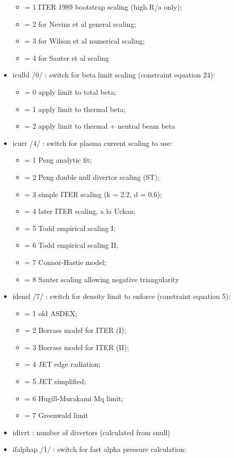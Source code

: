 \documentclass[]{article}
\providecommand{\tightlist}{%
  \setlength{\itemsep}{0pt}\setlength{\parskip}{0pt}}
\begin{document}
\begin{itemize}
  \begin{itemize}
  \tightlist
  \item
    = 1 ITER 1989 bootstrap scaling (high R/a only);
  \item
    = 2 for Nevins et al general scaling;
  \item
    = 3 for Wilson et al numerical scaling;
  \item
    = 4 for Sauter et al scaling
  \end{itemize}
\item
  iculbl /0/ : switch for beta limit scaling (constraint equation 24):

  \begin{itemize}
  \tightlist
  \item
    = 0 apply limit to total beta;
  \item
    = 1 apply limit to thermal beta;
  \item
    = 2 apply limit to thermal + neutral beam beta
  \end{itemize}
\item
  icurr /4/ : switch for plasma current scaling to use:

  \begin{itemize}
  \tightlist
  \item
    = 1 Peng analytic fit;
  \item
    = 2 Peng double null divertor scaling (ST);
  \item
    = 3 simple ITER scaling (k = 2.2, d = 0.6);
  \item
    = 4 later ITER scaling, a la Uckan;
  \item
    = 5 Todd empirical scaling I;
  \item
    = 6 Todd empirical scaling II;
  \item
    = 7 Connor-Hastie model;
  \item
    = 8 Sauter scaling allowing negative triangularity
  \end{itemize}
\item
  idensl /7/ : switch for density limit to enforce (constraint equation
  5):

  \begin{itemize}
  \tightlist
  \item
    = 1 old ASDEX;
  \item
    = 2 Borrass model for ITER (I);
  \item
    = 3 Borrass model for ITER (II);
  \item
    = 4 JET edge radiation;
  \item
    = 5 JET simplified;
  \item
    = 6 Hugill-Murakami Mq limit;
  \item
    = 7 Greenwald limit
  \end{itemize}
\item
  idivrt : number of divertors (calculated from snull)
\item
  ifalphap /1/ : switch for fast alpha pressure calculation:


\end{itemize}
\end{document}

